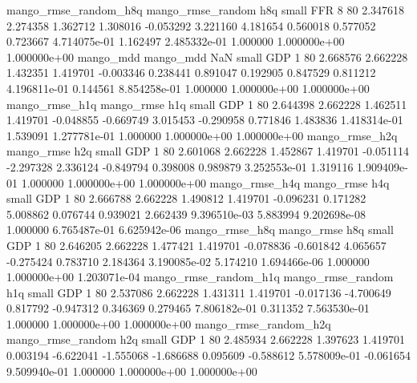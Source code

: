 mango_rmse_random_h8q mango_rmse_random                  h8q      small      FFR                 8 80 2.347618       2.274358 1.362712       1.308016   -0.053292      3.221160      4.181654     0.560018       0.577052  0.723667 4.714075e-01     1.162497   2.485332e-01            1.000000    1.000000e+00        1.000000e+00
            mango_mdd         mango_mdd                  NaN      small      GDP                 1 80 2.668576       2.662228 1.432351       1.419701   -0.003346      0.238441      0.891047     0.192905       0.847529  0.811212 4.196811e-01     0.144561   8.854258e-01            1.000000    1.000000e+00        1.000000e+00
       mango_rmse_h1q        mango_rmse                  h1q      small      GDP                 1 80 2.644398       2.662228 1.462511       1.419701   -0.048855     -0.669749      3.015453    -0.290958       0.771846  1.483836 1.418314e-01     1.539091   1.277781e-01            1.000000    1.000000e+00        1.000000e+00
       mango_rmse_h2q        mango_rmse                  h2q      small      GDP                 1 80 2.601068       2.662228 1.452867       1.419701   -0.051114     -2.297328      2.336124    -0.849794       0.398008  0.989879 3.252553e-01     1.319116   1.909409e-01            1.000000    1.000000e+00        1.000000e+00
       mango_rmse_h4q        mango_rmse                  h4q      small      GDP                 1 80 2.666788       2.662228 1.490812       1.419701   -0.096231      0.171282      5.008862     0.076744       0.939021  2.662439 9.396510e-03     5.883994   9.202698e-08            1.000000    6.765487e-01        6.625942e-06
       mango_rmse_h8q        mango_rmse                  h8q      small      GDP                 1 80 2.646205       2.662228 1.477421       1.419701   -0.078836     -0.601842      4.065657    -0.275424       0.783710  2.184364 3.190085e-02     5.174210   1.694466e-06            1.000000    1.000000e+00        1.203071e-04
mango_rmse_random_h1q mango_rmse_random                  h1q      small      GDP                 1 80 2.537086       2.662228 1.431311       1.419701   -0.017136     -4.700649      0.817792    -0.947312       0.346369  0.279465 7.806182e-01     0.311352   7.563530e-01            1.000000    1.000000e+00        1.000000e+00
mango_rmse_random_h2q mango_rmse_random                  h2q      small      GDP                 1 80 2.485934       2.662228 1.397623       1.419701    0.003194     -6.622041     -1.555068    -1.686688       0.095609 -0.588612 5.578009e-01    -0.061654   9.509940e-01            1.000000    1.000000e+00        1.000000e+00
